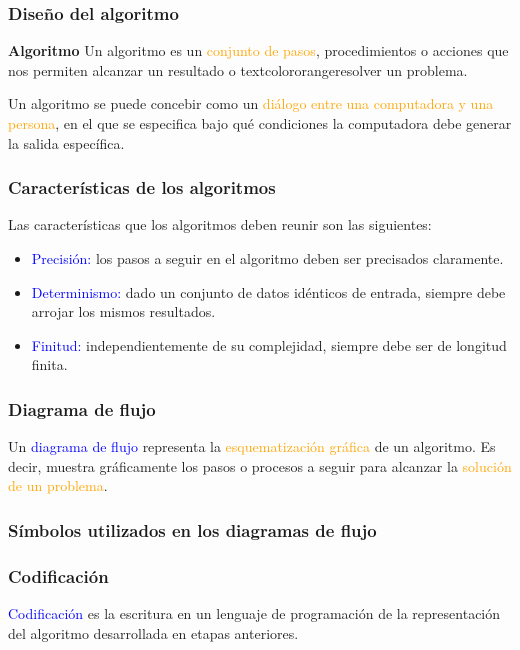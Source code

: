 \begin{frame}[t]
\frametitle{Diseño del algoritmo}
\begin{block}{\textbf{Algoritmo}}
Un algoritmo es un \textcolor{orange}{conjunto de pasos}, procedimientos o acciones que nos permiten alcanzar un resultado o textcolor{orange}{resolver un problema}.
\end{block}
Un algoritmo se puede concebir como un \textcolor{orange}{diálogo entre una computadora y una persona}, en el que se especifica bajo qué condiciones la computadora debe generar la salida específica.
\end{frame}

\begin{frame}[t]
\frametitle{Características de los algoritmos}
Las características que los algoritmos deben reunir son las siguientes:
\begin{itemize}
    \item \textcolor{blue}{Precisión:} los pasos a seguir en el algoritmo deben ser precisados claramente. \pause
    \item \textcolor{blue}{Determinismo:} dado un conjunto de datos idénticos de entrada, siempre debe arrojar los mismos resultados. \pause
    \item \textcolor{blue}{Finitud:} independientemente de su complejidad, siempre debe ser de longitud finita. 
\end{itemize}
\end{frame}

\begin{frame}[t]
\frametitle{Diagrama de flujo}
Un \textcolor{blue}{diagrama de flujo} representa la \textcolor{orange}{esquematización gráfica} de un algoritmo. Es decir, muestra gráficamente los pasos o procesos a seguir para alcanzar la \textcolor{orange}{solución de un problema}.
\end{frame}

\begin{frame}[t]
\frametitle{Símbolos utilizados en los diagramas de flujo}
\begin{center}
\end{center}
\end{frame}

\begin{frame}[t]
\frametitle{Codificación}
\textcolor{blue}{Codificación} es la escritura en un lenguaje de programación de la representación del algoritmo desarrollada en etapas anteriores.
\end{frame}

